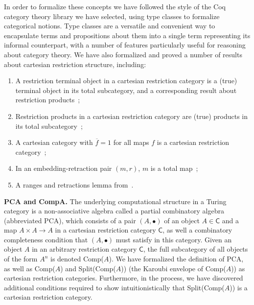 \documentclass{entcs} \usepackage{entcsmacro}
\begin{document}
In order to formalize these concepts we have followed the style of the Coq category theory library we have selected, using type classes to formalize categorical notions. Type classes are a versatile and convenient way to encapsulate terms and propositions about them into a single term representing its informal counterpart, with a number of features particularly useful for reasoning about category theory. We have also formalized and proved a number of results about cartesian restriction structure, including: 

\begin{enumerate}
	\item A restriction terminal object in a cartesian restriction category is a (true) terminal object in its total subcategory, and a corresponding result about restriction products~\cite{Turing};
	
	\item Restriction products in a cartesian restriction category are (true) products in its total subcategory~\cite{Turing};
	
	\item A cartesian category with $\overline{f} = 1$ for all maps $f$ is a cartesian restriction category~\cite{Turing};
	
	\item In an embedding-retraction pair $(m, r)$, $m$ is a total map~\cite{Restriction};
	
	\item A ranges and retractions lemma from~\cite{MyThesis}.
\end{enumerate}



{\bfseries PCA and CompA.} The underlying computational structure in a Turing category is a non-associative algebra called a partial combinatory algebra (abbreviated PCA), which consists of a pair $(A, \bullet)$ of an object $A \in \mathsf{C}$ and a map $A \times A \to A$ in a cartesian restriction category $\mathsf{C}$, as well a combinatory completeness condition that $(A, \bullet)$ must satisfy in this category. Given an object $A$ in an arbitrary restriction category $\mathsf{C}$, the full subcategory of all objects of the form $A^n$ is denoted Comp($A$). We have formalized the definition of PCA, as well as Comp($A$) and Split(Comp($A$)) (the Karoubi envelope of Comp($A$)) as cartesian restriction categories. Furthermore, in the process, we have discovered additional conditions required to show intuitionistically that Split(Comp($A$)) is a cartesian restriction category. 
\end{document}
